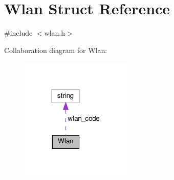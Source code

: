 \hypertarget{structWlan}{}\section{Wlan Struct Reference}
\label{structWlan}


{\ttfamily \#include $<$wlan.\+h$>$}



Collaboration diagram for Wlan\+:\nopagebreak
\begin{figure}[H]
\begin{center}
\leavevmode
\includegraphics[width=151pt]{structWlan__coll__graph}
\end{center}
\end{figure}
